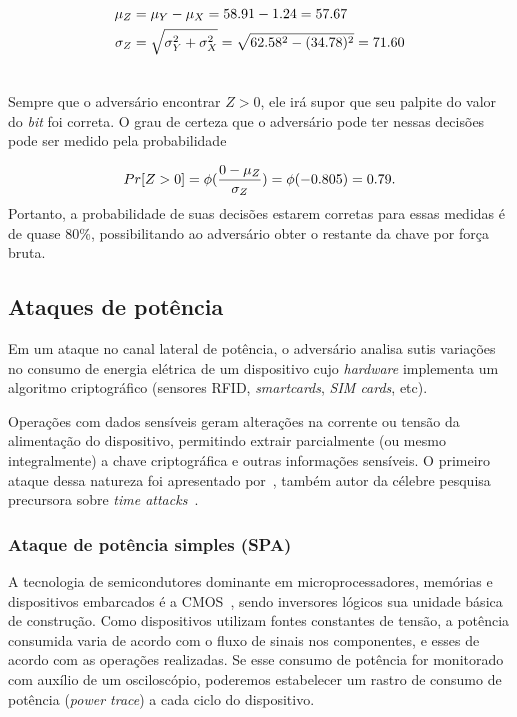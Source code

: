 \documentclass{SBCbookchapter}
\begin{document}
\begin{align}\notag
    \mu_{Z} &= \mu_{Y} - \mu_{X} = 58.91 - 1.24 = 57.67\\\notag
    \sigma_{Z} &= \sqrt{ \sigma_{Y}^{2} + \sigma_{X}^{2}} = \sqrt{ 62.58^{2} - (34.78)^{2}} = 71.60\\ \notag
\end{align}

Sempre que o advers\'{a}rio encontrar $Z > 0$, ele ir\'{a} supor que seu palpite do valor do \textit{bit} foi correta. O grau de certeza que o advers\'{a}rio pode ter nessas decis\~{o}es pode ser medido pela probabilidade

\begin{align}
    Pr[Z > 0] = \phi(\dfrac{0 - \mu_{Z}}{\sigma_{Z}}) = \phi(-0.805) = 0.79.\notag
\end{align}
Portanto, a probabilidade de suas decis\~{o}es estarem corretas para essas medidas \'{e} de quase 80\%, possibilitando ao advers\'{a}rio obter o restante da chave por for\c{c}a bruta.

\subsection{Ataques de potência}

Em um ataque no canal lateral de pot\^{e}ncia, o advers\'{a}rio analisa sutis varia\c{c}\~{o}es no consumo de energia el\'{e}trica de um dispositivo cujo \textit{hardware} implementa um algoritmo criptogr\'{a}fico (sensores RFID, \textit{smartcards}, \textit{SIM cards}, etc).

Opera\c{c}\~{o}es com dados sens\'{i}veis geram altera\c{c}\~{o}es na corrente ou tens\~{a}o da alimenta\c{c}\~{a}o do dispositivo, permitindo extrair parcialmente (ou mesmo integralmente) a chave criptogr\'{a}fica e outras informa\c{c}\~{o}es  sens\'{i}veis. O primeiro ataque dessa natureza foi apresentado por~\cite{Kocher:1999:DPA:646764.703989}, tamb\'{e}m autor da c\'{e}lebre pesquisa precursora sobre \textit{time attacks}~\cite{Kocher96}. 

\subsubsection{Ataque de potência simples (SPA)}
A tecnologia de semicondutores dominante em microprocessadores, mem\'{o}rias e dispositivos embarcados \'{e} a CMOS~\cite{sedra:1997}, sendo inversores l\'{o}gicos sua unidade b\'{a}sica de constru\c{c}\~{a}o. Como dispositivos utilizam fontes constantes de tens\~{a}o, a pot\^{e}ncia consumida varia de acordo com o fluxo de sinais nos componentes, e esses de acordo com as opera\c{c}\~{o}es realizadas. Se esse consumo de pot\^{e}ncia for monitorado com aux\'{i}lio de um oscilosc\'{o}pio, poderemos estabelecer um rastro de consumo de pot\^{e}ncia (\textit{power trace}) a cada ciclo do dispositivo.
\end{document}
